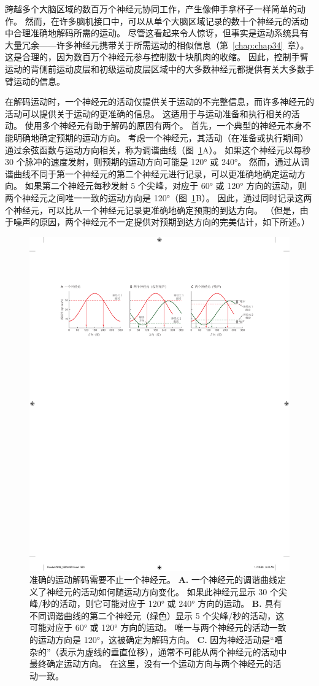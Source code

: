 跨越多个大脑区域的数百万个神经元协同工作，产生像伸手拿杯子一样简单的动作。
然而，在许多脑机接口中，可以从单个大脑区域记录的数十个神经元的活动中合理准确地解码所需的运动。
尽管这看起来令人惊讶，但事实是运动系统具有大量冗余——许多神经元携带关于所需运动的相似信息（第~\ref{chap:chap34}~章）。
这是合理的，因为数百万个神经元参与控制数十块肌肉的收缩。
因此，控制手臂运动的背侧前运动皮层和初级运动皮层区域中的大多数神经元都提供有关大多数手臂运动的信息。


在解码运动时，一个神经元的活动仅提供关于运动的不完整信息，而许多神经元的活动可以提供关于运动的更准确的信息。
这适用于与运动准备和执行相关的活动。
使用多个神经元有助于解码的原因有两个。
首先，一个典型的神经元本身不能明确地确定预期的运动方向。
考虑一个神经元，其活动（在准备或执行期间）通过余弦函数与运动方向相关，称为调谐曲线（图~\ref{fig:39_4}A）。
如果这个神经元以每秒 30 个脉冲的速度发射，则预期的运动方向可能是 120° 或 240°。
然而，通过从调谐曲线不同于第一个神经元的第二个神经元进行记录，可以更准确地确定运动方向。
如果第二个神经元每秒发射 5 个尖峰，对应于 60° 或 120° 方向的运动，则两个神经元之间唯一一致的运动方向是 120°（图~\ref{fig:39_4}B）。
因此，通过同时记录这两个神经元，可以比从一个神经元记录更准确地确定预期的到达方向。
（但是，由于噪声的原因，两个神经元不一定提供对预期到达方向的完美估计，如下所述。）


\begin{figure}[htbp]
	\centering
	\includegraphics[width=0.75\linewidth]{chap39/fig_39_4}
	\caption{准确的运动解码需要不止一个神经元。
		\textbf{A.} 一个神经元的调谐曲线定义了神经元的活动如何随运动方向变化。
		如果此神经元显示 30 个尖峰/秒的活动，则它可能对应于 120° 或 240° 方向的运动。 
		\textbf{B.} 具有不同调谐曲线的第二个神经元（绿色）显示 5 个尖峰/秒的活动，这可能对应于 60° 或 120° 方向的运动。
		唯一与两个神经元的活动一致的运动方向是 120°，这被确定为解码方向。
		\textbf{C.} 因为神经活动是“嘈杂的”（表示为虚线的垂直位移），通常不可能从两个神经元的活动中最终确定运动方向。
		在这里，没有一个运动方向与两个神经元的活动一致。}
	\label{fig:39_4}
\end{figure}


